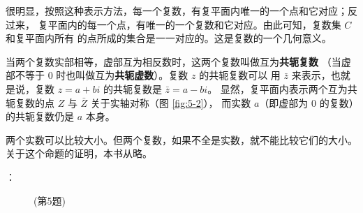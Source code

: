 很明显，按照这种表示方法，每一个复数，有复平面内唯一的一个点和它对应；反过来，
复平面内的每一个点，有唯一的一个复数和它对应。由此可知，复数集 $C$ 和复平面内所有
的点所成的集合是一一对应的。这是复数的一个几何意义。

当两个复数实部相等，虚部互为相反数时，这两个复数叫做互为\textbf{共轭复数}
（当虚部不等于 $0$ 时也叫做互为\textbf{共轭虚数}）。复数 $z$ 的共轭复数可以
用 $\bar{z}$ 来表示，也就是说，复数 $z = a + bi$ 的共轭复数是 $\bar{z} = a - bi$。
显然，复平面内表示两个互为共轭复数的点 $Z$ 与 $\bar{Z}$ 关于实轴对称（图 \ref{fig:5-2}），
而实数 $a$（即虚部为 $0$ 的复数）的共轭复数仍是 $a$ 本身。

两个实数可以比较大小。但两个复数，如果不全是实数，就不能比较它们的大小。
关于这个命题的证明，本书从略。


\lianxi
\begin{xiaotis}




\begin{xiaoxiaotis}



\end{xiaoxiaotis}


：

\begin{figure}[htbp]
    \centering
    
    \caption*{(第5题)}
\end{figure}


\begin{xiaoxiaotis}


\end{xiaoxiaotis}
\end{xiaotis}
